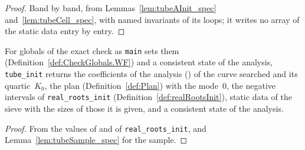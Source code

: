 \begin{proof}
  \leanok
  Band by band, from Lemmas~\ref{lem:tubeAInit_spec} and~\ref{lem:tubeCell_spec}, with named
  invariants of its loops; it writes no array of the static data entry by entry.
\end{proof}

\begin{lemma}\label{lem:tubeInit_spec}
  \leanok
  For globals of the exact check as \texttt{main} sets them (Definition~\ref{def:CheckGlobals.WF})
  and a consistent state of the analysis, \texttt{tube\_init} returns the coefficients of the
  analysis () of the curve searched and its quartic~$K_0$, the plan
  (Definition~\ref{def:Plan}) with the mode~$0$, the negative intervals of
  \texttt{real\_roots\_init} (Definition~\ref{def:realRootsInit}), static data of the sieve with
  the sizes of those it is given, and a consistent state of the analysis.
\end{lemma}

\begin{proof}
  \leanok
  From the values of  and of \texttt{real\_roots\_init}, and
  Lemma~\ref{lem:tubeSample_spec} for the sample.
\end{proof}
